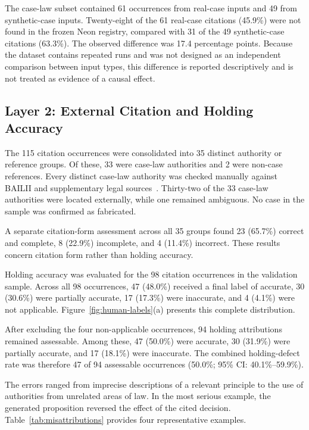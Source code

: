 \documentclass[conference]{IEEEtran}
\begin{document}
The case-law subset contained 61 occurrences from real-case inputs and 49 from synthetic-case inputs. Twenty-eight of the 61 real-case citations (45.9\%) were not found in the frozen Neon registry, compared with 31 of the 49 synthetic-case citations (63.3\%). The observed difference was 17.4 percentage points. Because the dataset contains repeated runs and was not designed as an independent comparison between input types, this difference is reported descriptively and is not treated as evidence of a causal effect.

\subsection{Layer 2: External Citation and Holding Accuracy}

The 115 citation occurrences were consolidated into 35 distinct authority or reference groups. Of these, 33 were case-law authorities and 2 were non-case references. Every distinct case-law authority was checked manually against BAILII and supplementary legal sources~\cite{bailii}. Thirty-two of the 33 case-law authorities were located externally, while one remained ambiguous. No case in the sample was confirmed as fabricated.

A separate citation-form assessment across all 35 groups found 23 (65.7\%) correct and complete, 8 (22.9\%) incomplete, and 4 (11.4\%) incorrect. These results concern citation form rather than holding accuracy.

Holding accuracy was evaluated for the 98 citation occurrences in the validation sample. Across all 98 occurrences, 47 (48.0\%) received a final label of accurate, 30 (30.6\%) were partially accurate, 17 (17.3\%) were inaccurate, and 4 (4.1\%) were not applicable. Figure~\ref{fig:human-labels}(a) presents this complete distribution.

After excluding the four non-applicable occurrences, 94 holding attributions remained assessable. Among these, 47 (50.0\%) were accurate, 30 (31.9\%) were partially accurate, and 17 (18.1\%) were inaccurate. The combined holding-defect rate was therefore 47 of 94 assessable occurrences (50.0\%; 95\% CI: 40.1\%--59.9\%).

The errors ranged from imprecise descriptions of a relevant principle to the use of authorities from unrelated areas of law. In the most serious example, the generated proposition reversed the effect of the cited decision. Table~\ref{tab:misattributions} provides four representative examples.
\end{document}
